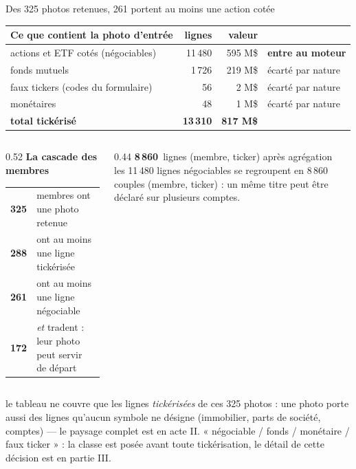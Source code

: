 \documentclass[11pt,aspectratio=169]{beamer}
\newcommand{\badgel}[2]{\colorbox{#1}{\textcolor{black!80}{\footnotesize\textbf{#2}}}}
\newcommand{\kpi}[3]{{\large\textbf{\textcolor{#1}{#2}}}~{\footnotesize #3}}
\newcommand{\defl}[1]{{\scriptsize\color{black!55}#1}}
\begin{document}
\begin{frame}{Des 325 photos retenues, 261 portent au moins une action cotée}
  \footnotesize
  \begin{center}
  \begin{tabular}{@{}lrrl@{}}
    \toprule
    \textbf{Ce que contient la photo d'entrée} & \textbf{lignes} & \textbf{valeur} & \\
    \midrule
    actions et ETF cotés (négociables) & 11\,480 & 595 M\$ & \badgel{okgreen!25}{entre au moteur}\\
    fonds mutuels                      &  1\,726 & 219 M\$ & écarté par nature\\
    faux tickers (codes du formulaire) &     56 &   2 M\$ & écarté par nature\\
    monétaires                         &     48 &   1 M\$ & écarté par nature\\
    \midrule
    \textbf{total tickérisé}           & \textbf{13\,310} & \textbf{817 M\$} & \\
    \bottomrule
  \end{tabular}
  \end{center}
  \vspace{1mm}
  \begin{columns}[t]
    \begin{column}{0.52\textwidth}
      \textbf{La cascade des membres}\\[0.8mm]
      \begin{tabular}{@{}rl@{}}
        \textbf{325} & membres ont une photo retenue\\
        \textbf{288} & ont au moins une ligne tickérisée\\
        \textbf{261} & ont au moins une ligne négociable\\
        \textbf{172} & \emph{et} tradent : leur photo peut servir de départ\\
      \end{tabular}
    \end{column}
    \begin{column}{0.44\textwidth}
      \kpi{helec}{8\,860}{lignes (membre, ticker) après agrégation}\\[1.5mm]
      \defl{les 11\,480 lignes négociables se regroupent en 8\,860 couples (membre, ticker) :
      un même titre peut être déclaré sur plusieurs comptes.}
    \end{column}
  \end{columns}\vspace{2mm}\par
  \defl{le tableau ne couvre que les lignes \emph{tickérisées} de ces 325 photos : une photo porte
  aussi des lignes qu'aucun symbole ne désigne (immobilier, parts de société, comptes) --- le
  paysage complet est en acte II. \; « négociable / fonds / monétaire / faux ticker » : la classe
  est posée avant toute tickérisation, le détail de cette décision est en partie III.}
\end{frame}
\end{document}
